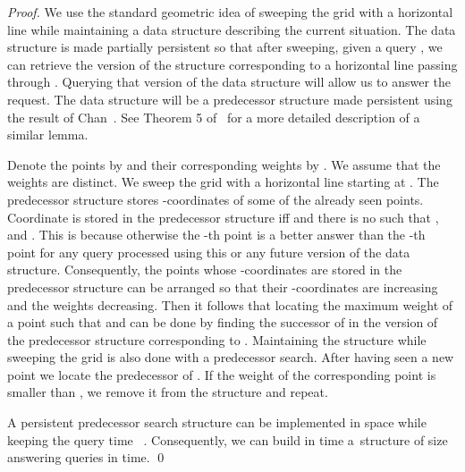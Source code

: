 \documentclass{llncs}
\begin{document}
\begin{proof}
We use the standard geometric idea of sweeping the grid with a horizontal line while maintaining a data structure describing the current
situation. The data structure is made partially persistent so that after sweeping, given a query , we can retrieve the version
of the structure corresponding to a horizontal line passing through . Querying that version of the data structure will allow us
to answer the request. The data structure will be a predecessor structure made persistent using the result of Chan~\cite{ChanPersistent}.
See Theorem 5 of~\cite{MosheSurvey} 
for a more detailed description of a similar lemma.

Denote the points by  and their corresponding weights by . We assume that the weights are distinct.
We sweep the grid with a horizontal line starting at . The predecessor structure stores -coordinates of some of the already
seen points. Coordinate  is stored in the predecessor structure iff  and there is no 
such that ,  and . This is because otherwise the -th point is a better answer
than the -th point for any query processed using this or any future version of the data structure.
Consequently, the points whose -coordinates are stored in the predecessor structure can be arranged so that
their -coordinates are increasing and the weights decreasing. Then it follows that locating the maximum weight
of a point  such that  and  can be done by finding the successor of  in the
version of the predecessor structure corresponding to . Maintaining the structure while sweeping the grid
is also done with a predecessor search. After having seen a new point  we locate the predecessor of .
If the weight of the corresponding point is smaller than , we remove it from the structure and repeat.

A persistent predecessor search structure can be implemented in space  while keeping the query
time ~\cite{ChanPersistent}. Consequently, we can build in  time a~structure of
size  answering queries in  time. \qed
\end{proof}
\end{document}
